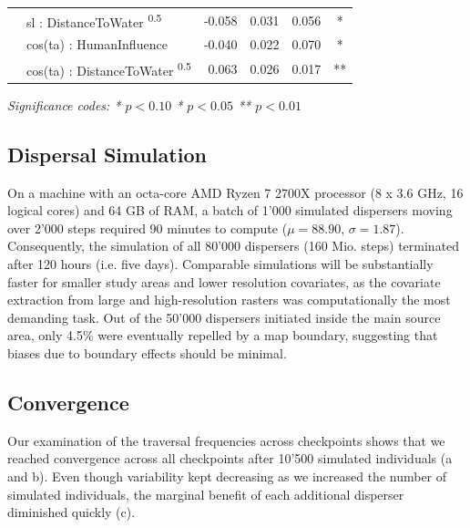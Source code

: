 \documentclass[abstract=on,10pt,a4paper,bibliography=totocnumbered]{article}
\begin{document}
\begin{table}
\begin{center}
{\begin{threeparttable}
\begin{tabular}{llrrrc}
         & sl : DistanceToWater \textsuperscript{0.5} & -0.058 & 0.031 & 0.056 & * \\
         & cos(ta) : HumanInfluence & -0.040 & 0.022 & 0.070 & * \\
         & cos(ta) : DistanceToWater \textsuperscript{0.5} & 0.063 & 0.026 & 0.017 & ** \\
         \bottomrule
      \end{tabular}
       \begin{tablenotes}
         \item \textit{Significance codes: * \(p < 0.10\) \quad ** \(p < 0.05\)
         \quad *** \(p < 0.01\)}
       \end{tablenotes}
    \end{threeparttable}
    }
  \end{center}
\end{table}

\subsection{Dispersal Simulation}
On a machine with an octa-core AMD Ryzen 7 2700X processor (8 x 3.6 GHz, 16
logical cores) and 64 GB of RAM, a batch of 1'000 simulated dispersers moving
over 2'000 steps required 90 minutes to compute (\(\mu = 88.90\), \(\sigma =
1.87\)). Consequently, the simulation of all 80'000 dispersers (160 Mio. steps)
terminated after 120 hours (i.e. five days). Comparable simulations will be
substantially faster for smaller study areas and lower resolution covariates, as
the covariate extraction from large and high-resolution rasters was
computationally the most demanding task. Out of the 50'000 dispersers initiated
inside the main source area, only 4.5\% were eventually repelled by a map
boundary, suggesting that biases due to boundary effects should be minimal.

\subsection{Convergence}
Our examination of the traversal frequencies across checkpoints shows that we
reached convergence across all checkpoints after 10'500 simulated individuals
(a and b). Even though variability kept decreasing as we
increased the number of simulated individuals, the marginal benefit of each
additional disperser diminished quickly (c).
\end{document}
